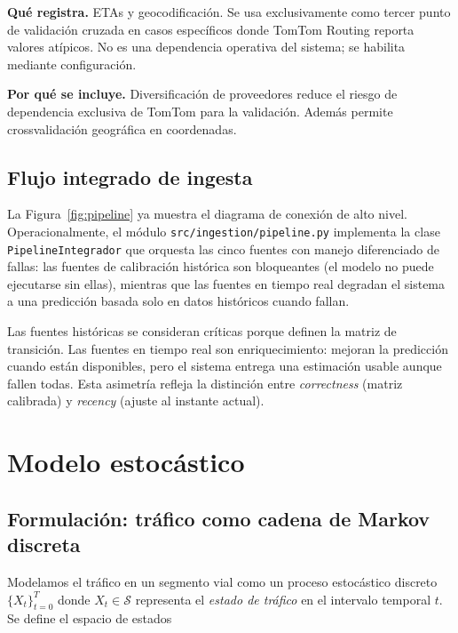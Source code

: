 \documentclass[11pt,a4paper]{article}
\begin{document}
\textbf{Qué registra.} ETAs y geocodificación. Se usa
exclusivamente como tercer punto de validación cruzada en casos
específicos donde TomTom Routing reporta valores atípicos. No es
una dependencia operativa del sistema; se habilita mediante
configuración.

\textbf{Por qué se incluye.} Diversificación de proveedores
reduce el riesgo de dependencia exclusiva de TomTom para la
validación. Además permite crossvalidación geográfica en
coordenadas.

\subsection{Flujo integrado de ingesta}

La Figura~\ref{fig:pipeline} ya muestra el diagrama de conexión
de alto nivel. Operacionalmente, el módulo
\texttt{src/ingestion/pipeline.py} implementa la clase
\texttt{PipelineIntegrador} que orquesta las cinco fuentes con
manejo diferenciado de fallas: las fuentes de calibración
histórica son bloqueantes (el modelo no puede ejecutarse sin
ellas), mientras que las fuentes en tiempo real degradan el
sistema a una predicción basada solo en datos históricos cuando
fallan.

\begin{tipbox}
Las fuentes históricas se consideran críticas porque definen la
matriz de transición. Las fuentes en tiempo real son
enriquecimiento: mejoran la predicción cuando están disponibles,
pero el sistema entrega una estimación usable aunque fallen
todas. Esta asimetría refleja la distinción entre
\emph{correctness} (matriz calibrada) y \emph{recency} (ajuste
al instante actual).
\end{tipbox}

\section{Modelo estocástico}
\label{sec:modelo}

\subsection{Formulación: tráfico como cadena de Markov discreta}

Modelamos el tráfico en un segmento vial como un proceso
estocástico discreto $\{X_t\}_{t=0}^T$ donde $X_t \in
\mathcal{S}$ representa el \emph{estado de tráfico} en el
intervalo temporal $t$. Se define el espacio de estados
\end{document}
